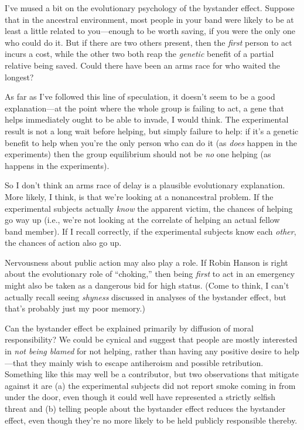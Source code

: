 {
 I've mused a bit on the evolutionary psychology of
the bystander effect. Suppose that in the ancestral environment, most
people in your band were likely to be at least a little related to
you---enough to be worth saving, if you were the only one who could do
it. But if there are two others present, then the \textit{first} person
to act incurs a cost, while the other two both reap the
\textit{genetic} benefit of a partial relative being saved. Could there
have been an arms race for who waited the longest?}

{
 As far as I've followed this line of speculation,
it doesn't seem to be a good explanation---at the point
where the whole group is failing to act, a gene that helps immediately
ought to be able to invade, I would think. The experimental result is
not a long wait before helping, but simply failure to help: if
it's a genetic benefit to help when
you're the only person who can do it (as \textit{does}
happen in the experiments) then the group equilibrium should not be
\textit{no} one helping (as happens in the experiments).}

{
 So I don't think an arms race of delay is a
plausible evolutionary explanation. More likely, I think, is that
we're looking at a nonancestral problem. If the
experimental subjects actually \textit{know} the apparent victim, the
chances of helping go way up (i.e., we're not looking
at the correlate of helping an actual fellow band member). If I recall
correctly, if the experimental subjects know each \textit{other}, the
chances of action also go up.}

{
 Nervousness about public action may also play a role. If Robin
Hanson is right about the evolutionary role of
``choking,'' then being
\textit{first} to act in an emergency might also be taken as a
dangerous bid for high status. (Come to think, I can't
actually recall seeing \textit{shyness} discussed in analyses of the
bystander effect, but that's probably just my poor
memory.)}

{
 Can the bystander effect be explained primarily by diffusion of
moral responsibility? We could be cynical and suggest that people are
mostly interested in \textit{not being blamed} for not helping, rather
than having any positive desire to help---that they mainly wish to
escape antiheroism and possible retribution. Something like this may
well be a contributor, but two observations that mitigate against it
are (a) the experimental subjects did not report smoke coming in from
under the door, even though it could well have represented a strictly
selfish threat and (b) telling people about the bystander effect
reduces the bystander effect, even though they're no
more likely to be held publicly responsible thereby.}

